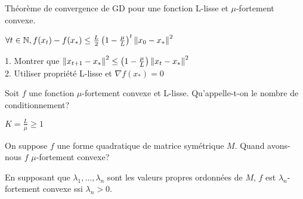 \begin{note}
  \begin{field}
    Théorème de convergence de GD pour une fonction L-lisse et
    $\mu$-fortement convexe.
  \end{field}
  \begin{field}
    $\forall t \in \mathbb{N}, f(x_t)-f(x_*)\leq
    \frac{L}{2}\left(1-\frac{\mu}{L}\right)^t\left\lVert x_0-x_*\right\rVert^2$
  \end{field}
  \begin{field}
    1. Montrer que $\left\lVert x_{t+1}-x_*\right\rVert^2 \leq
    \left(1-\frac{\mu}{L}\right)\left\lVert x_t-x_*\right\rVert^2$\\
    2. Utiliser propriété L-lisse et $\nabla f(x_*)=0$
  \end{field}
\end{note}

\begin{note}
  \begin{field}
    Soit $f$ une fonction $\mu$-fortement convexe et
    L-lisse. Qu'appelle-t-on le nombre de conditionnement?
  \end{field}
  \begin{field}
    $K = \frac{L}{\mu} \geq 1$
  \end{field}
  \begin{field}

  \end{field}
\end{note}

\begin{note}
  \begin{field}
    On suppose $f$ une forme quadratique de matrice symétrique $M$.
    Quand avons-nous $f$ $\mu$-fortement convexe?
  \end{field}
  \begin{field}
    En supposant que $\lambda_1,\dots,\lambda_n$ sont les valeurs
    propres ordonnées de $M$, $f$ est $\lambda_n$-fortement convexe ssi $\lambda_n>0$.
  \end{field}
  \begin{field}

  \end{field}
\end{note}


